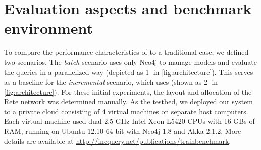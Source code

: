 



\label{benchmark_environment}
\section{Evaluation aspects and benchmark environment}

To compare the performance characteristics of \incqueryD{} to a traditional case, we defined two scenarios. The \textit{batch} scenario uses only Neo4j to manage models and evaluate the queries in a parallelized way (depicted as \textcircled{1} in \autoref{fig:architecture}). This serves as a baseline for the \textit{incremental} scenario, which uses \incqueryD{} (shown as \textcircled{2} in \autoref{fig:architecture}). For these initial experiments, the layout and allocation of the Rete network was determined manually. As the testbed, we deployed our system to a private cloud consisting of 4 virtual machines on separate host computers. Each virtual machine used dual 2.5 GHz Intel Xeon L5420 CPUs with 16 GBs of RAM, running on Ubuntu 12.10 64 bit with Neo4j 1.8 and Akka 2.1.2. More details are available at \url{http://incquery.net/publications/trainbenchmark}.

